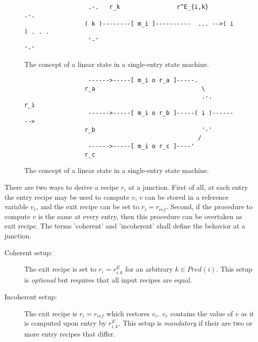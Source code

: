 \documentclass[12pt,a4paper]{scrartcl}
\begin{document}
\begin{figure}[htbp] \leavevmode \label{fig:composition}
\begin{verbatim}
                                                     
                                                    
                  .-.   r_k                r^E_{i,k}      .-.
                 ( k )--------[ m_i ]----------  ... -->( i ) . . .
                  '-'                                     '-'

\end{verbatim}
\caption{The concept of a linear state in a single-entry state machine.}
\end{figure}

\begin{figure}[htbp] \leavevmode \label{fig:junction}
\begin{verbatim}
                  ------>-----[ m_i o r_a ]-----.
                 r_a                              \
                                                  .-.    r_i
                  ------>-----[ m_i o r_b ]-----( i )--------> 
                 r_b                              '-'
                                                 /
                  ------>-----[ m_i o r_c ]----'
                 r_c 

\end{verbatim}
\caption{The concept of a linear state in a single-entry state machine.}
\end{figure}

There are two ways to derive a recipe $r_i$ at a junction.  First of all, at
each entry the entry recipe may be used to compute $v$, $v$ can be stored in a
reference variable $v_r$, and the exit recipe can be set to $r_i=r_{ref}$.
Second, if the procedure to compute $v$ is the same at every entry, then this
procedure can be overtaken as exit recipe. The terms 'coherent' and 'incoherent'
shall define the behavior at a junction. 

\begin{description}

    \item[Coherent setup:] The exit recipe is set to $r_i=r^E_{i,k}$ for
        an arbitrary $k\in Pred(i)$. This setup is \textit{optional} but
        requires that all input recipes are equal.

    \item[Incoherent setup:] The exit recipe is $r_i=r_{ref}$ which restores $v_r$.
        $v_r$ contains the value of $v$ as it is computed upon entry by
        $r^E_{i,k}$.  This setup is \textit{mandatory} if their are two or more
        entry recipes that differ.

\end{description}
\end{document}
